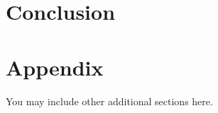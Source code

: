 \documentclass{article} %
\begin{document}
%

\section{Conclusion}\label{sec:conclusion}

\newpage




\newpage
\appendix
\section{Appendix}
You may include other additional sections here. 
\end{document}
